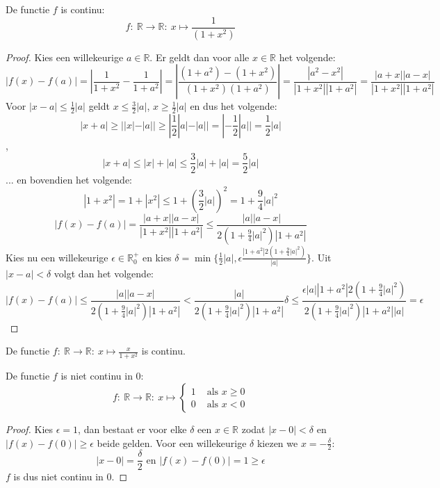 \documentclass[main.tex]{subfiles}
\begin{document}
\begin{vb}
  De functie $f$ is continu:
  \[ f:\ \mathbb{R} \rightarrow \mathbb{R}:\ x \mapsto \frac{1}{(1+x^{2})} \]

  \begin{proof}
    Kies een willekeurige $a\in \mathbb{R}$.
    Er geldt dan voor alle $x \in \mathbb{R}$ het volgende:
    \[
    |f(x)-f(a)|
    = \left| \frac{1}{1+x^{2}} - \frac{1}{1+a^{2}}\right|
    = \left| \frac{(1+a^{2})-(1+x^{2})}{(1+x^{2})(1+a^{2})}\right|
    = \frac{|a^{2}-x^{2}|}{|1+x^{2}||1+a^{2}|}
    = \frac{|a+x||a-x|}{|1+x^{2}||1+a^{2}|}
    \]
    Voor $|x-a| \le \frac{1}{2}|a|$ geldt $x \le \frac{3}{2}|a|$, $x \ge \frac{1}{2}|a|$ en dus het volgende:
    \[ |x+a| \ge ||x|-|a|| \ge |\frac{1}{2}|a| - |a|| = |-\frac{1}{2}|a|| = \frac{1}{2}|a| \]
    ,
    \[ |x+a| \le |x|+|a| \le \frac{3}{2}|a| + |a| = \frac{5}{2}|a| \]
    ... en bovendien het volgende:
    \[ |1+x^{2}| = 1 + |x^{2}| \le 1 + \left(\frac{3}{2}|a|\right)^{2} = 1 + \frac{9}{4}|a|^{2} \]
    \[
    |f(x)-f(a)|
    = \frac{|a+x||a-x|}{|1+x^{2}||1+a^{2}|}
    \le \frac{|a||a-x|}{2\left(1 + \frac{9}{4}|a|^{2}\right)|1+a^{2}|}
    \]
    Kies nu een willekeurige $\epsilon \in \mathbb{R}_{0}^{+}$ en kies $\delta = \min\{\frac{1}{2}|a|,\epsilon\frac{|1+a^{2}|2\left(1 + \frac{9}{4}|a|^{2}\right)}{|a|} \}$.
    Uit $|x-a| < \delta$ volgt dan het volgende:
    \[ 
    |f(x)-f(a)|
    \le \frac{|a||a-x|}{2\left(1 + \frac{9}{4}|a|^{2}\right)|1+a^{2}|}
    < \frac{|a|}{2\left(1 + \frac{9}{4}|a|^{2}\right)|1+a^{2}|}\delta
    \le \frac{\epsilon|a||1+a^{2}|2\left(1 + \frac{9}{4}|a|^{2}\right)}{2\left(1 + \frac{9}{4}|a|^{2}\right)|1+a^{2}||a|} = \epsilon
    \]
  \end{proof}
\feed
\end{vb}

\begin{vb}
  De functie $f:\ \mathbb{R} \rightarrow \mathbb{R}:\ x \mapsto \frac{x}{1+x^{2}}$ is continu.

\end{vb}

\begin{tvb}
  De functie $f$ is niet continu in $0$:
  \[
  f:\ \mathbb{R} \rightarrow \mathbb{R}:\ x\mapsto 
  \left\{
    \begin{array}{cl}
      1 & \text{ als } x \ge 0\\
      0 & \text{ als } x < 0
    \end{array}
  \right.
  \]

  \begin{proof}
    Kies $\epsilon = 1$, dan bestaat er voor elke $\delta$ een $x\in \mathbb{R}$ zodat $|x-0|<\delta$ en $|f(x)-f(0)|\ge \epsilon$ beide gelden.
    Voor een willekeurige $\delta$ kiezen we $x = -\frac{\delta}{2}$:
    \[ |x-0| = \frac{\delta}{2} \text{ en } |f(x)-f(0)| = 1 \ge \epsilon \]
    $f$ is dus niet continu in $0$.
  \end{proof}
\end{tvb}
\end{document}
